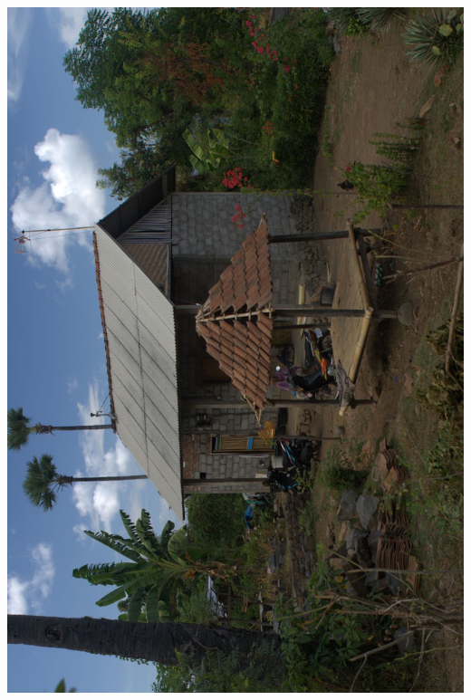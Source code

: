 \newpage\vspace*{-5cm}
\thispagestyle{empty}
\hspace*{-3.5cm}
\includegraphics[width=15.9cm]{articles/pagesCentrales/_MG_0936.JPG}

